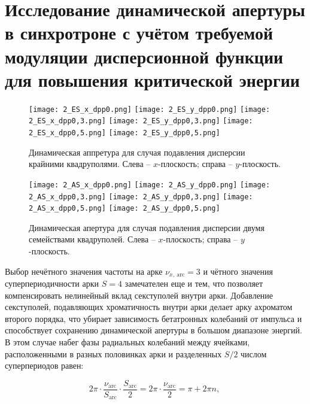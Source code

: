 \section{Исследование динамической апертуры в синхротроне с учётом требуемой модуляции дисперсионной функции для повышения критической энергии}

\begin{figure} [h!]
	\center
	\texttt{[image: 2\_ES\_x\_dpp0.png]}
	\texttt{[image: 2\_ES\_y\_dpp0.png]}
	\texttt{[image: 2\_ES\_x\_dpp0,3.png]}
	\texttt{[image: 2\_ES\_y\_dpp0,3.png]}
	\texttt{[image: 2\_ES\_x\_dpp0,5.png]}
	\texttt{[image: 2\_ES\_y\_dpp0,5.png]}
	\caption{Динамическая аппретура для случая подавления дисперсии крайними квадруполями. 
		Слева – $x$-плоскость; справа – $y$-плоскость.}
	\label{fig:DA_ES_dpp}
\end{figure}	

\begin{figure} [h!]
   \center
   \texttt{[image: 2\_AS\_x\_dpp0.png]}
   \texttt{[image: 2\_AS\_y\_dpp0.png]}
   \texttt{[image: 2\_AS\_x\_dpp0,3.png]}
   \texttt{[image: 2\_AS\_y\_dpp0,3.png]}
   \texttt{[image: 2\_AS\_x\_dpp0,5.png]}
   \texttt{[image: 2\_AS\_y\_dpp0,5.png]}
   \caption{Динамическая апертура для случая подавления дисперсии двумя семействами квадруполей.
Слева – $x$-плоскость; справа – $y$-плоскость.}
   \label{fig:DA_AS_dpp}
\end{figure}

\par Выбор нечётного значения частоты на арке $\nu_{x,\ \text{arc}}=3$ и чётного значения суперпериодичности арки $S=4$ замечателен еще и тем, что позволяет компенсировать нелинейный вклад секступолей внутри арки. Добавление секступолей, подавляющих хроматичность внутри арки делает арку ахроматом второго порядка, что убирает зависимость бетатронных колебаний от импульса и способствует сохранению динамической апертуры в большом диапазоне энергий. В этом случае набег фазы радиальных колебаний между ячейками, расположенными в разных половинках арки и разделенных $S/2$ числом суперпериодов равен:

\begin{equation}
2\pi\cdot\frac{\nu_{\text{arc}}}{S_{\text{arc}}}\cdot\frac{S_{\text{arc}}}{2}=2\pi\cdot\frac{\nu_{\text{arc}}}{2}=\pi+2\pi n,\
\label{eq:chrom_period}
\end{equation}

